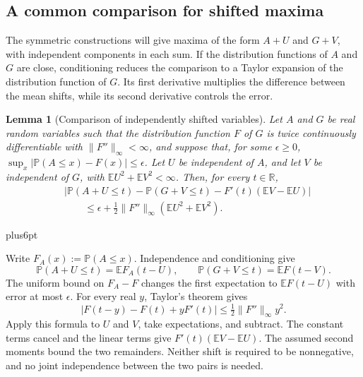 \documentclass[11pt,letterpaper,twoside,leqno]{article}
\makeatletter
\theoremstyle{bookplain}
\newtheorem{lemma}{Lemma}
\theoremstyle{bookremark}
\renewenvironment{proof}[1][\proofname]{\par
  \pushQED{\qed}\normalfont\topsep6pt plus6pt\relax
  \trivlist\item[\hskip\labelsep\bfseries #1\@addpunct{.}]\ignorespaces
}{\popQED\endtrivlist\@endpefalse}
\newcommand{\E}{\mathbb E}
\newcommand{\Pp}{\mathbb P}
\newcommand{\R}{\mathbb R}
\makeatother
\begin{document}
\subsection{A common comparison for shifted maxima}
\label{app:lower-comparison}

The symmetric constructions will give maxima of the form $A+U$
and $G+V$, with independent components in each sum. If the
distribution functions of $A$ and $G$ are close, conditioning
reduces the comparison to a Taylor expansion of the distribution
function of $G$. Its first derivative multiplies the difference
between the mean shifts, while its second derivative controls
the error.

\begin{lemma}[Comparison of independently shifted variables]
\label{lower:shift-comparison}
Let $A$ and $G$ be real random variables such that the distribution
function $F$ of $G$ is twice continuously differentiable with
$\|F''\|_\infty<\infty$, and suppose that, for some $\epsilon\ge0$,
$\sup_x|\Pp(A\le x)-F(x)|\le\epsilon$.
Let $U$ be independent of $A$, and let $V$ be independent of $G$,
with $\E U^2+\E V^2<\infty$. Then, for every $t\in\R$,
\begin{equation}
\begin{split}
&\left|\Pp(A+U\le t)-\Pp(G+V\le t)
       -F'(t)(\E V-\E U)\right|\\
&\hspace{2em}\le \epsilon+
       \frac12\|F''\|_\infty(\E U^2+\E V^2).
\end{split}
\label{lower:eq:shift-comparison}
\end{equation}
\end{lemma}

\begin{proof}
Write $F_A(x):=\Pp(A\le x)$. Independence and conditioning give
\[
 \Pp(A+U\le t)=\E F_A(t-U),\qquad
 \Pp(G+V\le t)=\E F(t-V).
\]
The uniform bound on $F_A-F$ changes the first expectation to
$\E F(t-U)$ with error at most $\epsilon$. For every real $y$,
Taylor's theorem gives
\[
 |F(t-y)-F(t)+yF'(t)|\le\tfrac12\|F''\|_\infty y^2.
\]
Apply this formula to $U$ and $V$, take expectations, and subtract.
The constant terms cancel and the linear terms give
$F'(t)(\E V-\E U)$. The assumed second moments bound the two
remainders. Neither shift is required to be nonnegative, and no
joint independence between the two pairs is needed.
\end{proof}
\end{document}

